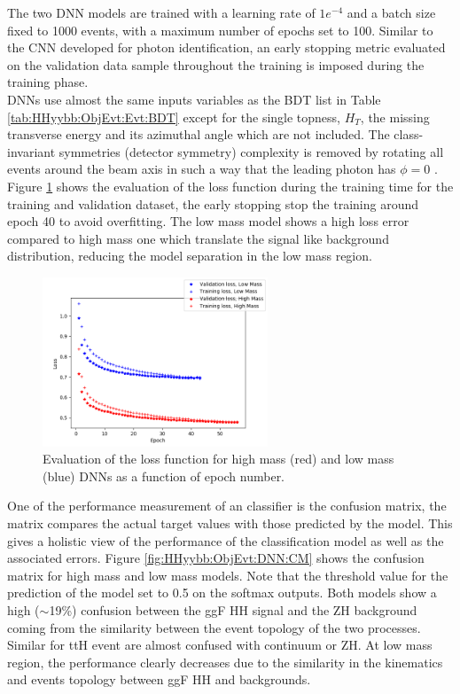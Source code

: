 The two DNN models are trained with a learning rate of $1e^{-4}$ and a batch size fixed to 1000 events, with a maximum number of epochs set to 100. Similar to the CNN developed for photon identification, an early stopping metric evaluated on the validation data sample throughout the training is imposed during the training phase.\\ 
DNNs use almost the same inputs variables as the BDT list in Table \ref{tab:HHyybb:ObjEvt:Evt:BDT} except for the single topness, $H_T$, the missing transverse energy and its azimuthal angle which are not included. The class-invariant symmetries (detector symmetry) complexity is removed by rotating all events around the beam axis in such a way that the leading photon has $\phi=0$ . \\
Figure \ref{fig:HHyybb:ObjEvt:DNN:Loss} shows the evaluation of the loss function during the training time for the training and validation dataset, the early stopping stop the training around epoch 40 to avoid overfitting. The low mass model shows a high loss error compared to high mass one which translate the signal like background distribution, reducing the model separation in the low mass region.
\begin{figure}[ht]
    \centering
    \includegraphics[width=0.6\textwidth]{Ch5/Img/Loss_DNN.png}
    \caption{Evaluation of the loss function for high mass (red) and low mass (blue) DNNs as a function of epoch number.}
    \label{fig:HHyybb:ObjEvt:DNN:Loss}
\end{figure}
One of the performance measurement of an classifier is the confusion matrix, the matrix compares the actual target values with those predicted by the model. This gives a holistic view of the performance of the classification model as well as the associated errors. Figure \ref{fig:HHyybb:ObjEvt:DNN:CM} shows the confusion matrix for high mass and low mass models. Note that the threshold value for the prediction of the model set to 0.5 on the softmax outputs. Both models show a high ($\sim$19\%) confusion between the ggF HH signal and the ZH background coming from the similarity between the event topology of the two processes. Similar for ttH event are almost confused with continuum or ZH. At low mass region, the performance clearly decreases due to the similarity in the kinematics and events topology between ggF HH and backgrounds.
